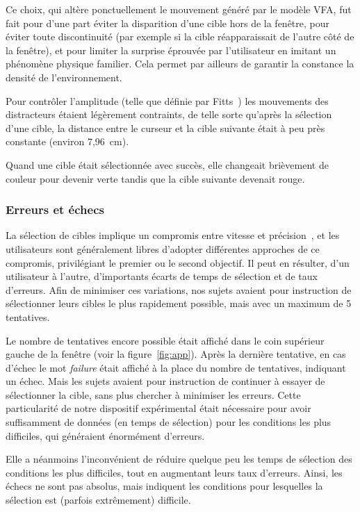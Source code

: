 	Ce choix, qui altère ponctuellement le mouvement généré par le modèle VFA, fut fait pour d'une part éviter la disparition d'une cible hors de la fenêtre, pour éviter toute discontinuité (par exemple si la cible réapparaissait de l'autre côté de la fenêtre), et pour limiter la \og surprise \fg{} éprouvée par l'utilisateur en imitant un phénomène physique familier. Cela permet par ailleurs de garantir la constance la densité de l'environnement.
	
	Pour contrôler l'amplitude (telle que définie par Fitts~\cite{fitts1954information}) les mouvements des distracteurs étaient légèrement contraints, de telle sorte qu'après la sélection d'une cible, la distance entre le curseur et la cible suivante était à peu près constante (environ 7,96~cm).
	
	Quand une cible était sélectionnée avec succès, elle changeait brièvement de couleur pour devenir verte tandis que la cible suivante devenait rouge.
	
	\subsubsection{Erreurs et échecs}
	La sélection de cibles implique un compromis entre vitesse et précision~\cite{guiard2011fitt}, et les utilisateurs sont généralement libres d'adopter différentes approches de ce compromis, privilégiant le premier ou le second objectif. Il peut en résulter, d'un utilisateur à l'autre, d'importants écarts de temps de sélection et de taux d'erreurs. Afin de minimiser ces variations, nos sujets avaient pour instruction de sélectionner leurs cibles le plus rapidement possible, mais avec un maximum de 5 tentatives.
	
	Le nombre de tentatives encore possible était affiché dans le coin supérieur gauche de la fenêtre (voir la figure~\ref{fig:app}). Après la dernière tentative, en cas d'échec le mot \emph{failure} était affiché à la place du nombre de tentatives, indiquant un échec. Mais les sujets avaient pour instruction de continuer à essayer de sélectionner la cible, sans plus chercher à minimiser les erreurs. Cette particularité de notre dispositif expérimental était nécessaire pour avoir suffisamment de données (en temps de sélection) pour les conditions les plus difficiles, qui généraient énormément d'erreurs.
	
	Elle a néanmoins l'inconvénient de réduire quelque peu les temps de sélection des conditions les plus difficiles, tout en augmentant leurs taux d'erreurs. Ainsi, les échecs ne sont pas absolus, mais indiquent les conditions pour lesquelles la sélection est (parfois extrêmement) difficile.
	
